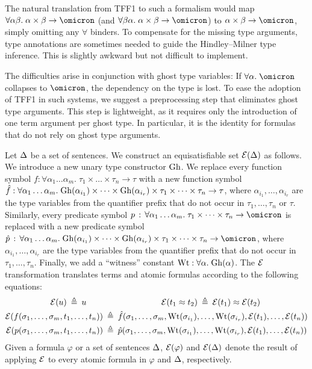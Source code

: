 The natural translation from TFF1 to such a formalism would map $\forall
\alpha\beta.\; \alpha\times\beta\to\omicron$ (and $\forall \beta\alpha.\;
\alpha\times\beta\to\omicron$) to $\alpha\times\beta\to\omicron$, simply
omitting any $\forall$ binders. To compensate for the missing type arguments,
type annotations are sometimes needed to guide the Hindley--Milner type
inference. This is slightly awkward but not difficult to implement.

The difficulties arise in conjunction with ghost type variables: If
$\forall\alpha.\;\omicron$ collapses to $\omicron$, the dependency on the type
is lost.
%
To ease the adoption of TFF1 in such systems, we suggest a preprocessing step
that eliminates ghost type arguments. This step is lightweight, as it requires
only the introduction of one term argument per ghost type. In particular,
it is the identity for formulas that do not rely on ghost type arguments.


Let $\mathrm{\Delta}$ be a set of sentences.
We construct an equisatisfiable set $\mathcal{E}(\mathrm{\Delta})$ as follows.
%
We introduce a new unary type constructor $\mathrm{Gh}$.
We replace every function symbol $f : \forall \alpha_1\dots\alpha_m .\; \tau_1 \times \dots \times \tau_n \to \tau$
with a new function symbol $\hat{f} : \forall \alpha_1\dots\alpha_m .\;
\mathrm{Gh}(\alpha_{i_1}) \times \dots \times \mathrm{Gh}(\alpha_{i_r}) \times
\tau_1 \times \dots \times \tau_n \to \tau$,
where $\alpha_{i_1},\dots,\alpha_{i_r}$ are the type
variables from the quantifier prefix that do not occur in
$\tau_1,\dots,\tau_n$ or $\tau$.
Similarly, every predicate symbol $p \,\ty\,
\forall \alpha_1\dots\alpha_m .\;\allowbreak \tau_1 \times \dots \times \tau_n \to \omicron$
is replaced with a new predicate symbol $\hat{p} \,\ty\,
\forall \alpha_1\dots\alpha_m .\;\allowbreak
\ghost(\alpha_{i_1}) \times \dots \times \ghost(\alpha_{i_r}) \times
\tau_1 \times \dots \times \tau_n \to \omicron$,
where $\alpha_{i_1},\dots,\alpha_{i_r}$ are the type
variables from the quantifier prefix that do not occur in
$\tau_1,\dots,\tau_n$.
Finally, we add a ``witness'' constant $\mathrm{Wt} : \forall \alpha.\;\mathrm{Gh}(\alpha)$.
The $\mathcal{E}$ transformation translates terms and atomic
formulas according to the following equations:
\begin{align*}
\mathcal{E}(u) \:\triangleq\: u
\quad\quad & \qquad\qquad\qquad\quad
\mathcal{E}(t_1 \approx t_2) \:\triangleq\: \mathcal{E}(t_1) \approx \mathcal{E}(t_2) \\
\mathcal{E}(f(\sigma_1,\dots,\sigma_m,t_1,\dots,t_n)) &\:\triangleq\:
\hat{f}(\sigma_1,\dots,\sigma_m,\mathrm{Wt}(\sigma_{i_1}),\dots,\mathrm{Wt}(\sigma_{i_r}),
\mathcal{E}(t_1),\dots,\mathcal{E}(t_n)) \\
\mathcal{E}(p(\sigma_1,\dots,\sigma_m,t_1,\dots,t_n)) &\:\triangleq\:
\hat{p}(\sigma_1,\dots,\sigma_m,\mathrm{Wt}(\sigma_{i_1}),\dots,\mathrm{Wt}(\sigma_{i_r}),
\mathcal{E}(t_1),\dots,\mathcal{E}(t_n))
\end{align*}
Given a formula $\varphi$ or a set of sentences $\mathrm{\Delta}$,
$\mathcal{E}(\varphi)$ and $\mathcal{E}(\mathrm{\Delta})$ denote the result of
applying $\mathcal{E}$ to every atomic formula in $\varphi$ and
$\mathrm{\Delta}$, respectively.


